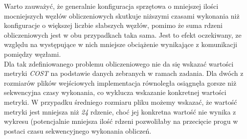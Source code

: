 \documentclass{article}
\begin{document}
    Warto zauważyć, że generalnie konfiguracja sprzętowa o mniejszej ilości mocniejszych węzłów obliczeniowych skutkuje niższymi czasami wykonania niż konfiguracje o większej liczbie słabszych węzłów, pomimo że suma rdzeni obliczeniowych jest w obu przypadkach taka sama. Jest to efekt oczekiwany, ze względu na występujące w nich mniejsze obciążenie wynikające z komunikacji pomiędzy węzłami.\\
    
    Dla tak zdefiniowanego problemu obliczeniowego nie da się wskazać wartości metryki \textit{COST} na podstawie danych zebranych w ramach zadania. Dla dwóch z rozmiarów plików wejściowych implementacja równoległa osiągnęła gorsze niż sekwencyjna czasy wykonania, co wyklucza wskazanie konkretnej wartości metryki. W przypadku średniego rozmiaru pliku możemy wskazać, że wartość metryki jest mniejsza niż \textit{24} rdzenie, choć jej konkretna wartość nie wynika z wykresu (potencjalnie mniejsza ilość rdzeni pozwoliłaby na przecięcie progu w postaci czasu sekwencyjnego wykonania obliczeń.
\end{document}
